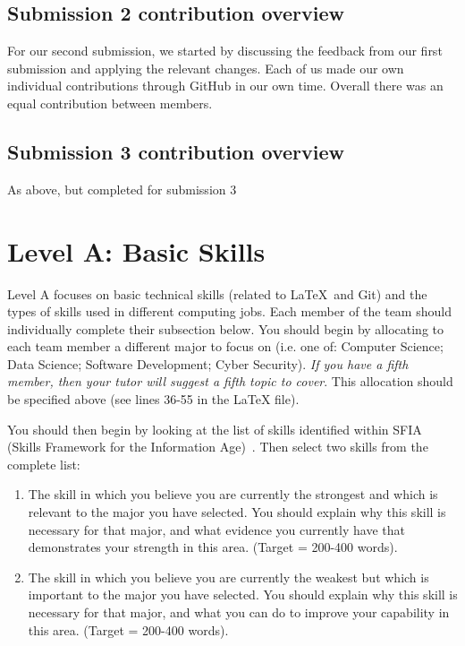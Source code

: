 \documentclass[a4paper, 11pt]{report}
\begin{document}
\subsection{Submission 2 contribution overview}

For our second submission, we started by discussing the feedback from our first submission and applying the relevant changes. Each of us made our own individual contributions through GitHub in our own time. Overall there was an equal contribution between members.

\subsection{Submission 3 contribution overview}

As above, but completed for submission 3



\newpage
\section{Level A: Basic Skills}

Level A focuses on basic technical skills (related to \LaTeX\ and Git) and the types of skills used in different computing jobs. Each member of the team should individually complete their subsection below. You should begin by allocating to each team member a different major to focus on (i.e. one of: Computer Science; Data Science; Software Development; Cyber Security). \textit{If you have a fifth member, then your tutor will suggest a fifth topic to cover}. This allocation should be specified above (see lines 36-55 in the LaTeX file).

You should then begin by looking at the list of skills identified within SFIA (Skills Framework for the Information Age)~\cite{sfia}. Then select two skills from the complete list:
\begin{enumerate}
	\item The skill in which you believe you are currently the strongest and which is relevant to the major you have selected. You should explain why this skill is necessary for that major, and what evidence you currently have that demonstrates your strength in this area. (Target = 200-400 words).
	\item The skill in which you believe you are currently the weakest but which is important to the major you have selected. You should explain why this skill is necessary for that major, and what you can do to improve your capability in this area. (Target = 200-400 words).
\end{enumerate}
\end{document}
